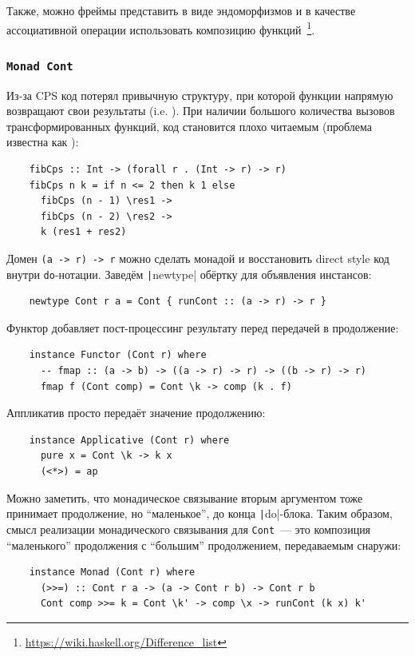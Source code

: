 Также, можно фреймы представить в виде эндоморфизмов и в качестве ассоциативной операции использовать композицию функций~\cite{ploeg2014reflection}\footnote{\url{https://wiki.haskell.org/Difference_list}}.


\subsubsection{\texttt{Monad Cont}} \label{subsubsec:monad-cont}

Из-за CPS код потерял привычную структуру, при которой функции напрямую возвращают свои результаты (i.e. ).
При наличии большого количества вызовов трансформированных функций, код становится плохо читаемым (проблема известна как ):
\begin{verbatim}
    fibCps :: Int -> (forall r . (Int -> r) -> r)
    fibCps n k = if n <= 2 then k 1 else
      fibCps (n - 1) \res1 ->
      fibCps (n - 2) \res2 ->
      k (res1 + res2)
\end{verbatim}

Домен \texttt{(a -> r) -> r} можно сделать монадой и восстановить direct style код внутри \texttt{do}-нотации.
Заведём \texttt|newtype| обёртку для объявления инстансов:
\begin{verbatim}
    newtype Cont r a = Cont { runCont :: (a -> r) -> r }
\end{verbatim}

Функтор добавляет пост-процессинг результату перед передачей в продолжение:
\begin{verbatim}
    instance Functor (Cont r) where
      -- fmap :: (a -> b) -> ((a -> r) -> r) -> ((b -> r) -> r)
      fmap f (Cont comp) = Cont \k -> comp (k . f)
\end{verbatim}

Аппликатив просто передаёт значение продолжению:
\begin{verbatim}
    instance Applicative (Cont r) where
      pure x = Cont \k -> k x
      (<*>) = ap
\end{verbatim}

Можно заметить, что монадическое связывание вторым аргументом тоже принимает продолжение, но ``маленькое'', до конца \texttt|do|-блока.
Таким образом, смысл реализации монадического связывания для \texttt{Cont}~--- это композиция ``маленького'' продолжения с ``большим'' продолжением, передаваемым снаружи:
\begin{verbatim}
    instance Monad (Cont r) where
      (>>=) :: Cont r a -> (a -> Cont r b) -> Cont r b
      Cont comp >>= k = Cont \k' -> comp \x -> runCont (k x) k'
\end{verbatim}

